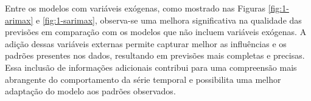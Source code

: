 Entre os modelos com variáveis exógenas, como mostrado nas Figuras \ref{fig:1-arimax} e \ref{fig:1-sarimax}, observa-se uma melhora significativa na qualidade das previsões em comparação com os modelos que não incluem variáveis exógenas. A adição dessas variáveis externas permite capturar melhor as influências e os padrões presentes nos dados, resultando em previsões mais completas e precisas. Essa inclusão de informações adicionais contribui para uma compreensão mais abrangente do comportamento da série temporal e possibilita uma melhor adaptação do modelo aos padrões observados.

